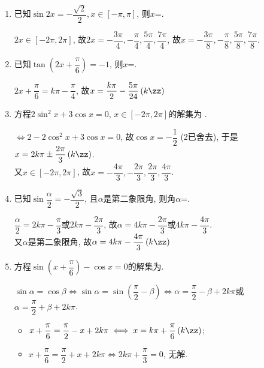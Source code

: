 \begin{enumerate}
\item 已知$\sin2x=-\dfrac{\sqrt2}{2}, x\in[-\pi,\pi]$, 则$x$=. 
\begin{jieda}
$2x\in[-2\pi,2\pi]$, 故$2x=-\dfrac{3\pi}{4},-\dfrac{\pi}{4},\dfrac{5\pi}{4},\dfrac{7\pi}{4}$, 
故$x=-\dfrac{3\pi}{8},-\dfrac{\pi}{8},\dfrac{5\pi}{8},\dfrac{7\pi}{8}$. 
\end{jieda}

\item 已知$\tan\left(2x+\dfrac{\pi}{6}\right)=-1$, 则$x$=. 
\begin{jieda}
$2x+\dfrac{\pi}{6}=k\pi-\dfrac{\pi}{4}$, 故$x=\dfrac{k\pi}{2}-\dfrac{5\pi}{24}\left(k\zz\right)$
\end{jieda}


\item 方程$2\sin^2x+3\cos{x}=0$, $x\in[-2\pi,2\pi]$的解集为 .
\begin{jieda}
$\iff 2-2\cos^2x+3\cos{x}=0$, 故$\cos{x}=-\dfrac{1}{2}$ (2已舍去), 于是$x=2k\pi\pm\dfrac{2\pi}{3}\left(k\zz\right)$. \\
又$x\in[-2\pi,2\pi]$, 故$x=-\dfrac{4\pi}{3},-\dfrac{2\pi}{3},\dfrac{2\pi}{3},\dfrac{4\pi}{3}$. 
\end{jieda}

\item 已知$\sin\dfrac{\alpha}{2}=-\dfrac{\sqrt{3}}{2}$, 且$\alpha$是第二象限角, 则角$\alpha$=. 
\begin{jieda}
$\dfrac{\alpha}{2}=2k\pi-\dfrac{\pi}{3}$或$2k\pi-\dfrac{2\pi}{3}$, 故$\alpha=4k\pi-\dfrac{2\pi}{3}$或$4k\pi-\dfrac{4\pi}{3}$. \\
又$\alpha$是第二象限角, 故$\alpha=4k\pi-\dfrac{4\pi}{3}\left(k\zz\right)$
\end{jieda}


\item 方程$\sin\left(x+\dfrac{\pi}{6}\right)-\cos{x}=0$的解集为. 
\begin{jieda}
$\sin\alpha=\cos\beta\iff \sin\alpha=\sin\left(\dfrac{\pi}{2}-\beta\right)\iff
\alpha=\dfrac{\pi}{2}-\beta+2k\pi$或$\alpha=\dfrac{\pi}{2}+\beta+2k\pi$. 
\begin{itemize}
\item $x+\dfrac{\pi}{6}=\dfrac{\pi}{2}-x+2k\pi\iff x=k\pi+\dfrac{\pi}{6}\left(k\zz\right)$; 
\item $x+\dfrac{\pi}{6}=\dfrac{\pi}{2}+x+2k\pi\iff 2k\pi+\dfrac{\pi}{3}=0$, 无解. 
\end{itemize}
\end{jieda}



\end{enumerate}
